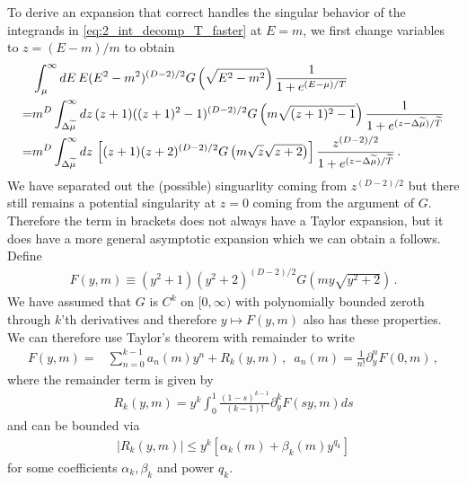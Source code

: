 \documentclass[sn-mathphys,Numbered]{sn-jnl}
\begin{document}
To derive an expansion that correct handles the singular behavior of the integrands in \eqref{eq:2_int_decomp_T_faster} at $E=m$, we first change variables to $z=(E-m)/m$  to obtain
\begin{align}
&\int_{\mu}^\infty dE\, E(E^2-m^2)^{(D-2)/2} G\left(\sqrt{E^2-m^2}\right)
    \frac{1}{1+e^{(E-\mu)/T}}\notag   \\
    =&m^{D}\int_{\Delta\widetilde{\mu}}^\infty dz\, (z+1)((z+1)^2-1)^{(D-2)/2} G\left(m\sqrt{(z+1)^2-1}\right)
    \frac{1}{1+e^{(z-\Delta\widetilde{\mu})/\widetilde{T}}} \notag\\
        =&m^{D}\int_{\Delta\widetilde{\mu}}^\infty dz\, \left[(z+1)(  z+2)^{(D-2)/2} G\left(m\sqrt{z}\sqrt{z+2}\right)\right]
    \frac{z^{(D-2)/2}}{1+e^{(z-\Delta\widetilde{\mu})/\widetilde{T}}} \,.\label{eq:T_faster_int_1_change_vars}
\end{align}
We have separated out the (possible) singuarlity coming from $z^{(D-2)/2}$ but there still remains a potential singularity at $z=0$ coming from the argument of  $G$. Therefore the term in brackets does not always have a Taylor expansion, but it does have a more general asymptotic expansion which we can obtain a follows.  Define  
\begin{align}\label{eq:F_y_m_def}
  F(y,m)\equiv  (y^2+1)(  y^2+2)^{(D-2)/2} G\left(my\sqrt{y^2+2}\right)\,.
\end{align}
We have assumed that $G$ is $C^k$ on $[0,\infty)$ with polynomially bounded zeroth through $k$'th derivatives and therefore $y\mapsto F(y,m)$ also has these properties.  We can therefore use Taylor's theorem with remainder to write
\begin{align}\label{eq:F_y_m_Taylor}
F(y,m)=&\sum_{n=0}^{k-1} a_n(m)y^n +R_k(y,m)\,, \,\,\,a_n(m)=\frac{1}{n!}\partial_y^n F(0,m)\,,
\end{align}
where the remainder term is given by
\begin{align}
R_k(y,m)=y^k \int_0^1\frac{(1-s)^{k-1}}{(k-1)!}\partial_y^k F(sy,m)ds
\end{align}
and can be bounded via
\begin{align}\label{eq:R_k_poly_bound}
|R_k(y,m)|\leq y^k[\alpha_k(m)+\beta_k(m)y^{q_k}]
\end{align}
for some coefficients $\alpha_k,\beta_k$ and power $q_k$.
\end{document}

